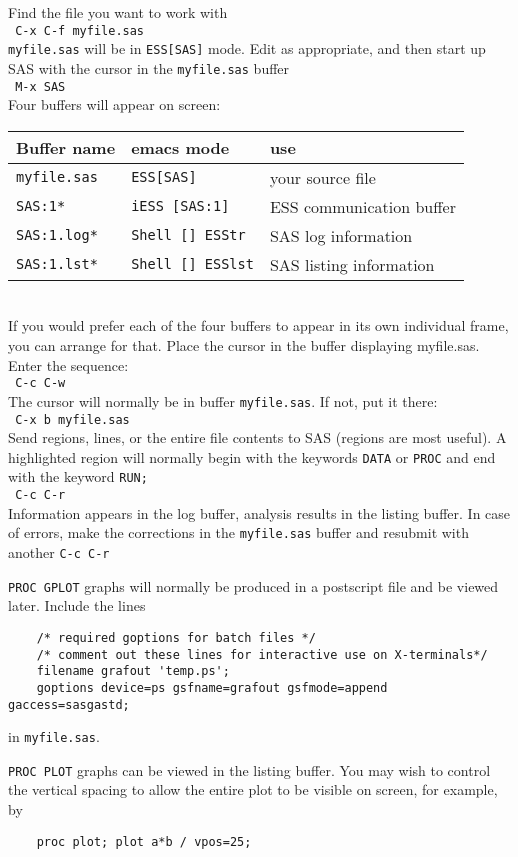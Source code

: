 \documentclass{article}
\newcommand{\elcode}[1]{\\{\tt\hspace*{2em} #1}\\}
\begin{document}
 Find the file you want to work with
    \elcode{C-x C-f myfile.sas}
 {\tt myfile.sas} will be in {\tt ESS[SAS]} mode.
Edit as appropriate, and then start up SAS with the cursor in
the {\tt myfile.sas} buffer
    \elcode{M-x SAS}
Four buffers will appear on screen:\\
\begin{tabular}{lll}
\hline
Buffer name     & emacs mode         & use\\
\hline
\tt myfile.sas  & \tt ESS[SAS]       &your source file         \\
\tt *SAS:1*     & \tt iESS [SAS:1]   &ESS communication buffer \\
\tt *SAS:1.log* & \tt Shell [] ESStr &SAS log information      \\
\tt *SAS:1.lst* & \tt Shell [] ESSlst&SAS listing information  \\
\hline
\end{tabular}\\[1ex]
 If you would prefer each of the four buffers to appear in its
 own individual frame, you can arrange for that.  Place the
 cursor in the buffer displaying myfile.sas.  Enter the
 sequence:
    \elcode{C-c C-w}
The cursor will normally be in buffer {\tt myfile.sas}.
If not, put it there:
    \elcode{C-x b myfile.sas}
Send regions, lines, or the entire file contents to SAS
(regions are most useful).  A highlighted region will normally
begin with the keywords {\tt DATA} or {\tt PROC} and end with the
keyword {\tt RUN;}
    \elcode{C-c C-r}

Information appears in the log buffer, analysis results in the
listing buffer.  In case of errors, make the corrections in the
{\tt myfile.sas} buffer and resubmit with another {\tt C-c C-r}

{\tt PROC GPLOT} graphs will normally be produced in a postscript
file and be viewed later.  Include the lines
{\small
\begin{verbatim}
    /* required goptions for batch files */
    /* comment out these lines for interactive use on X-terminals*/
    filename grafout 'temp.ps';
    goptions device=ps gsfname=grafout gsfmode=append gaccess=sasgastd;
\end{verbatim}
}
\noindent
in {\tt myfile.sas}.

 {\tt PROC PLOT} graphs can be viewed in the listing buffer.  You may
 wish to control the vertical spacing to allow the entire plot
 to be visible on screen, for example, by
\begin{verbatim}
    proc plot; plot a*b / vpos=25;
\end{verbatim}
\end{document}
